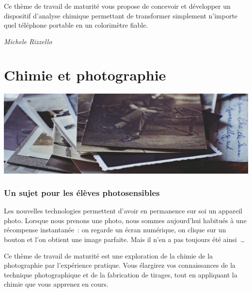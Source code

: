 \documentclass[
  10pt,
  french,
  a5paper,
  openany]{book}
\newenvironment{signature}{\begin{flushright}}{\end{flushright}}
\begin{document}
Ce thème de travail de maturité vous propose de concevoir et développer un dispositif d'analyse chimique permettant de transformer simplement n'importe quel téléphone portable en un colorimètre fiable.

\begin{signature}
\emph{Michele Rizzello}

\end{signature}

\hypertarget{chimie-et-photographie}{%
\chapter{Chimie et photographie}\label{chimie-et-photographie}}

\begin{center}
\includegraphics[width=1\textwidth,height=\textheight]{images/chimie-et-photographie.jpg}

\end{center}


\hypertarget{un-sujet-pour-les-uxe9luxe8ves-photosensibles}{%
\subsection*{Un sujet pour les élèves photosensibles}\label{un-sujet-pour-les-uxe9luxe8ves-photosensibles}}

Les nouvelles technologies permettent d'avoir en permanence sur soi un appareil photo. Lorsque nous prenons une photo, nous sommes aujourd'hui habitués à une récompense instantanée~: on regarde un écran numérique, on clique sur un bouton et l'on obtient une image parfaite. Mais il n'en a pas toujours été ainsi~\ldots{}

Ce thème de travail de maturité est une exploration de la chimie de la photographie par l'expérience pratique. Vous élargirez vos connaissances de la technique photographique et de la fabrication de tirages, tout en appliquant la chimie que vous apprenez en cours.
\end{document}
